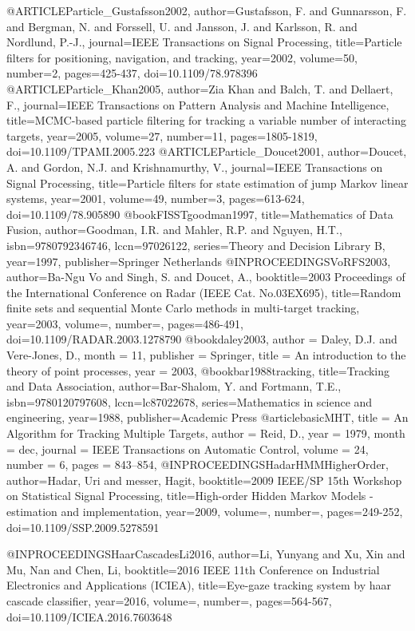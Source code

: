 @ARTICLE{Particle_Gustafsson2002,
author={Gustafsson, F. and Gunnarsson, F. and Bergman, N. and Forssell, U. and Jansson, J. and Karlsson, R. and Nordlund, P.-J.},
journal={IEEE Transactions on Signal Processing},
title={Particle filters for positioning, navigation, and tracking},
year={2002},
volume={50},
number={2},
pages={425-437},
doi={10.1109/78.978396}}
@ARTICLE{Particle_Khan2005,
author={Zia Khan and Balch, T. and Dellaert, F.},
journal={IEEE Transactions on Pattern Analysis and Machine Intelligence},
title={{MCMC}-based particle filtering for tracking a variable number of interacting targets},
year={2005},
volume={27},
number={11},
pages={1805-1819},
doi={10.1109/TPAMI.2005.223}}
@ARTICLE{Particle_Doucet2001,
author={Doucet, A. and Gordon, N.J. and Krishnamurthy, V.},
journal={IEEE Transactions on Signal Processing},
title={Particle filters for state estimation of jump {M}arkov linear systems},
year={2001},
volume={49},
number={3},
pages={613-624},
doi={10.1109/78.905890}}
@book{FISSTgoodman1997,
title={Mathematics of Data Fusion},
author={Goodman, I.R. and Mahler, R.P. and Nguyen, H.T.},
isbn={9780792346746},
lccn={97026122},
series={Theory and Decision Library B},
year={1997},
publisher={Springer Netherlands}
}
@INPROCEEDINGS{VoRFS2003,
author={Ba-Ngu Vo and Singh, S. and Doucet, A.},
booktitle={2003 Proceedings of the International Conference on Radar (IEEE Cat. No.03EX695)},
title={Random finite sets and sequential {M}onte {C}arlo methods in multi-target tracking},
year={2003},
volume={},
number={},
pages={486-491},
doi={10.1109/RADAR.2003.1278790}}
@book{daley2003,
author = {Daley, D.J. and Vere-Jones, D.},
month = {11},
publisher = {Springer},
title = {{An introduction to the theory of point processes}},
year = {2003},
}
@book{bar1988tracking,
title={Tracking and Data Association},
author={Bar-Shalom, Y. and Fortmann, T.E.},
isbn={9780120797608},
lccn={lc87022678},
series={Mathematics in science and engineering},
year={1988},
publisher={Academic Press}
}
@article{basicMHT,
title = {An Algorithm for Tracking Multiple Targets},
author = {Reid, D.},
year = {1979},
month = dec,
journal = {IEEE Transactions on Automatic Control},
volume = {24},
number = {6},
pages = {843--854},
}
@INPROCEEDINGS{HadarHMMHigherOrder,
author={Hadar, Uri and messer, Hagit},
booktitle={2009 IEEE/SP 15th Workshop on Statistical Signal Processing},
title={High-order Hidden Markov Models - estimation and implementation},
year={2009},
volume={},
number={},
pages={249-252},
doi={10.1109/SSP.2009.5278591}}

@INPROCEEDINGS{HaarCascadesLi2016,
author={Li, Yunyang and Xu, Xin and Mu, Nan and Chen, Li},
booktitle={2016 IEEE 11th Conference on Industrial Electronics and Applications (ICIEA)},
title={Eye-gaze tracking system by haar cascade classifier},
year={2016},
volume={},
number={},
pages={564-567},
doi={10.1109/ICIEA.2016.7603648}}


